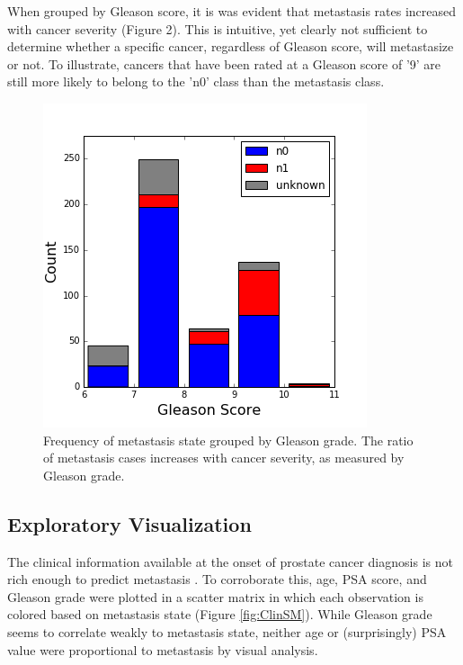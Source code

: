\documentclass[final]{article}
\begin{document}
When grouped by Gleason score, it is was evident that metastasis rates increased
with cancer severity (Figure 2).  This is  intuitive, yet clearly
not sufficient to determine whether a specific cancer, regardless of Gleason
score, will metastasize or not.  To illustrate, cancers that have been rated at
a Gleason score of '9' are still more likely to belong to the 'n0' class than
the metastasis class.

\begin{figure}
  \centering
  \includegraphics[scale=0.5]{GleasonHist}
  \caption{Frequency of metastasis state grouped by Gleason grade.\label{fig:preGSHist}
  The ratio of metastasis cases increases with cancer severity, as measured by Gleason grade.}
\end{figure}

\subsection{Exploratory Visualization}

The clinical information available at the onset of prostate cancer diagnosis is
not rich enough to predict metastasis \cite{Brawley16}.  To corroborate this,
age, PSA score, and Gleason grade were plotted in a scatter matrix in which
each observation is colored based on metastasis state (Figure \ref{fig:ClinSM}).
While Gleason grade seems to correlate weakly to metastasis state, neither age or
(surprisingly) PSA value were proportional to metastasis by visual analysis.
\end{document}
